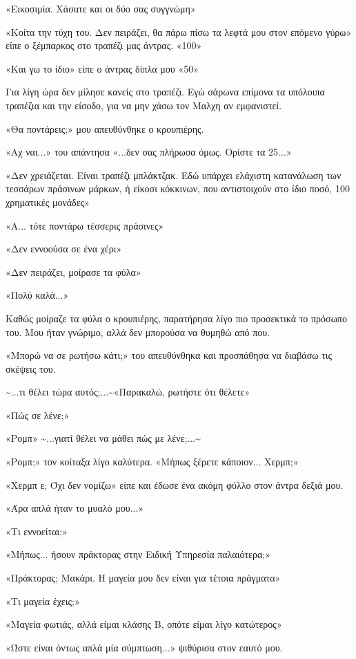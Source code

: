 \documentclass[12pt,twoside, openany]{book}
\begin{document}
«Εικοσιμία. Χάσατε και οι δύο σας συγγνώμη»

«Κοίτα την τύχη του. Δεν πειράζει, θα πάρω πίσω τα λεφτά μου στον επόμενο γύρω» είπε ο ξέμπαρκος στο τραπέζι μας άντρας. «100»

«Και γω το ίδιο» είπε ο άντρας δίπλα μου «50»

Για λίγη ώρα δεν μίλησε κανείς στο τραπέζι. Εγώ σάρωνα επίμονα τα υπόλοιπα τραπέζια και την είσοδο, για να μην χάσω τον Μαλχη αν εμφανιστεί.

«Θα ποντάρεις;» μου απευθύνθηκε ο κρουπιέρης.

«Αχ ναι...» του απάντησα «...δεν σας πλήρωσα όμως. Ορίστε τα 25...»

«Δεν χρειάζεται. Είναι τραπέζι μπλάκτζακ. Εδώ υπάρχει ελάχιστη κατανάλωση των τεσσάρων πράσινων μάρκων, ή είκοσι κόκκινων, που αντιστοιχούν στο ίδιο ποσό, 100 χρηματικές μονάδες»

«Α... τότε ποντάρω τέσσερις πράσινες»

«Δεν εννοούσα σε ένα χέρι»

«Δεν πειράζει, μοίρασε τα φύλα»

«Πολύ καλά...»

Καθώς μοίραζε τα φύλα ο κρουπιέρης, παρατήρησα λίγο πιο προσεκτικά το πρόσωπο του. Μου ήταν γνώριμο, αλλά δεν μπορούσα να θυμηθώ από που.

«Μπορώ να σε ρωτήσω κάτι;» του απευθύνθηκα και προσπάθησα να διαβάσω τις σκέψεις του.

\textasciitilde ...τι θέλει τώρα αυτός;...\textasciitilde «Παρακαλώ, ρωτήστε ότι θέλετε»

«Πώς σε λένε;»

«Ρομπ» \textasciitilde ...γιατί θέλει να μάθει πώς με λένε;...\textasciitilde 

«Ρομπ;» τον κοίταξα λίγο καλύτερα. «Μήπως ξέρετε κάποιον... Χερμπ;»

«Χερμπ ε; Όχι δεν νομίζω» είπε και έδωσε ένα ακόμη φύλλο στον άντρα δεξιά μου.

«Άρα απλά ήταν το μυαλό μου...»

«Τι εννοείται;»

«Μήπως... ήσουν πράκτορας στην Ειδική Υπηρεσία παλαιότερα;»

«Πράκτορας; Μακάρι. Η μαγεία μου δεν είναι για τέτοια πράγματα»

«Τι μαγεία έχεις;»

«Μαγεία φωτιάς, αλλά είμαι κλάσης Β, οπότε είμαι λίγο κατώτερος»

«Ώστε είναι όντως απλά μία σύμπτωση...» ψιθύρισα στον εαυτό μου.
\end{document}
